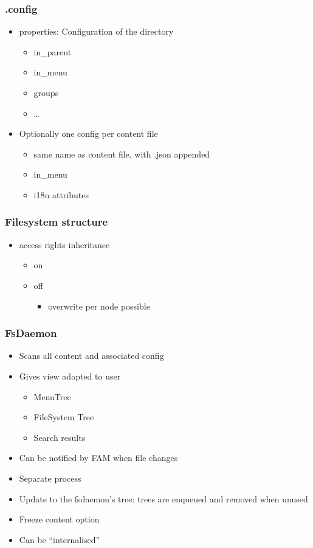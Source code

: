 \documentclass[]{beamer}
\begin{document}
\begin{frame}
\frametitle{.config}
\begin{itemize}
  \item properties: Configuration of the directory
    \begin{itemize}
      \item in\_parent
      \item in\_menu
      \item groups
      \item \ldots
    \end{itemize}
  \item Optionally one config per content file
    \begin{itemize}
      \item same name as content file, with .json appended
      \item in\_menu
      \item i18n attributes
    \end{itemize}
\end{itemize}

\end{frame}



\begin{frame}
\frametitle{Filesystem structure}
\begin{itemize}
  \item access rights inheritance
    \begin{itemize}
      \item on
      \item off
        \begin{itemize}
          \item overwrite per node possible
        \end{itemize}
    \end{itemize}
\end{itemize}
\end{frame}

\begin{frame}
\frametitle{FsDaemon}

    \begin{itemize}
      \item Scans all content and associated config
      \item Gives view adapted to user
        \begin{itemize}
          \item MenuTree
          \item FileSystem Tree
          \item Search results
        \end{itemize}
      \item Can be notified by FAM when file changes
      \item Separate process 
      \item Update to the fsdaemon's tree: trees are enqueued and removed when unused
      \item Freeze content option
      \item Can be ``internalised'' 
    \end{itemize}
\end{frame}
\end{document}
